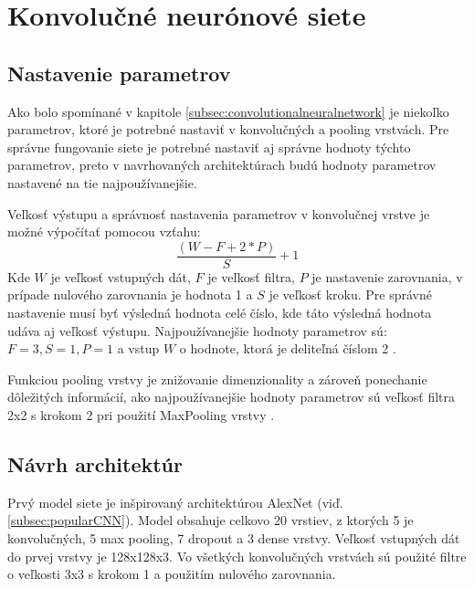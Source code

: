 
\section{Konvolučné neurónové siete}
\label{sec:architekuraCNN}

\subsection{Nastavenie parametrov}
\label{subsec:nastavenieparametrov}
Ako bolo spomínané v kapitole \ref{subsec:convolutionalneuralnetwork} je niekoľko parametrov, ktoré je potrebné
    nastaviť v konvolučných a pooling vrstvách.
Pre správne fungovanie siete je potrebné nastaviť aj správne hodnoty týchto parametrov, preto v navrhovaných architektúrach budú
    hodnoty parametrov nastavené na tie najpoužívanejšie.

Veľkosť výstupu a správnosť nastavenia parametrov v konvolučnej vrstve je možné výpočítať pomocou vzťahu:
\begin{equation}
    \frac{(W - F + 2*P)}{S} + 1
\end{equation}
Kde $W$ je veľkosť vstupných dát, $F$ je veľkosť filtra, $P$ je nastavenie zarovnania, v prípade nulového zarovnania je hodnota 1 a $S$ je veľkosť kroku.
Pre správné nastavenie musí byť výsledná hodnota celé číslo, kde táto výsledná hodnota udáva aj veľkosť výstupu.
Najpoužívanejšie hodnoty parametrov sú: $F = 3, S = 1, P = 1$ a vstup $W$ o hodnote, ktorá je deliteľná číslom 2 \cite{odkaz:CNNArchitecture}.

Funkciou pooling vrstvy je znižovanie dimenzionality a zároveň ponechanie dôležitých informácií, ako najpoužívanejšie hodnoty parametrov sú
    veľkosť filtra 2x2 s krokom 2 pri použití MaxPooling vrstvy \cite{odkaz:CNNArchitecture}.


\subsection{Návrh architektúr}
\label{subsec:navrharchitektur}
Prvý model siete je inšpirovaný architektúrou AlexNet (viď. \ref{subsec:popularCNN}).
Model obsahuje celkovo 20 vrstiev, z ktorých 5 je konvolučných, 5 max pooling, 7 dropout a 3 dense vrstvy.
Veľkosť vstupných dát do prvej vrstvy je 128x128x3.
Vo všetkých konvolučných vrstvách sú použité filtre o veľkosti 3x3 s krokom 1 a použitím nulového zarovnania.

